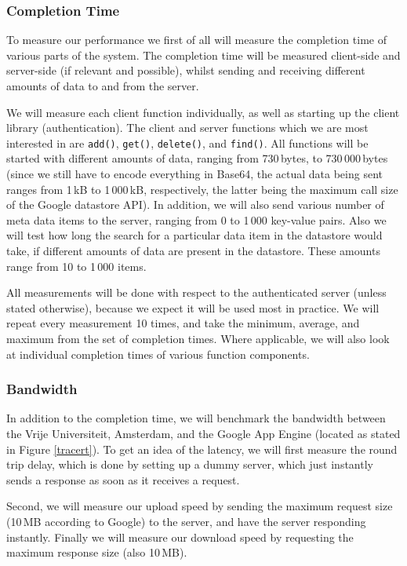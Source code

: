\subsubsection{Completion Time}
To measure our performance we first of all will measure the completion time of
various parts of the system. The completion time will be measured client-side
and server-side (if relevant and possible), whilst sending and receiving
different amounts of data to and from the server. 

We will measure each client function individually, as well as starting up the
client library (authentication). The client and server functions which we are
most interested in are \texttt{add()}, \texttt{get()}, \texttt{delete()}, and
\texttt{find()}. All functions will be started with different amounts of 
data, ranging from 730\,bytes, to 730\,000\,bytes (since we still have to encode
everything in Base64, the actual data being sent ranges from 1\,kB to 1\,000\,kB,
respectively, the latter being the maximum call size of the Google datastore
API). In addition, we will also send various number of meta data items to the
server, ranging from 0 to 1\,000 key-value pairs. Also we will test how long
the search for a particular data item in the datastore would take, if different
amounts of data are present in the datastore. These amounts range from 10 to
1\,000 items.

All measurements will be done with respect to the authenticated server (unless
stated otherwise), because we expect it will be used most in practice. We will
repeat every measurement 10 times, and take the minimum, average, and maximum
from the set of completion times. Where applicable, we will also look at
individual completion times of various function components.

\subsubsection{Bandwidth}
In addition to the completion time, we will benchmark the bandwidth between the
Vrije Universiteit, Amsterdam, and the Google App Engine (located as stated in
Figure \ref{tracert}). To get an idea of the latency, we will first measure the
round trip delay, which is done by setting up a dummy server, which just
instantly sends a response as soon as it receives a request. 

Second, we will measure our upload speed by sending the maximum request size
(10\,MB according to Google) to the server, and have the server responding instantly.
Finally we will measure our download speed by requesting the maximum response
size (also 10\,MB).

